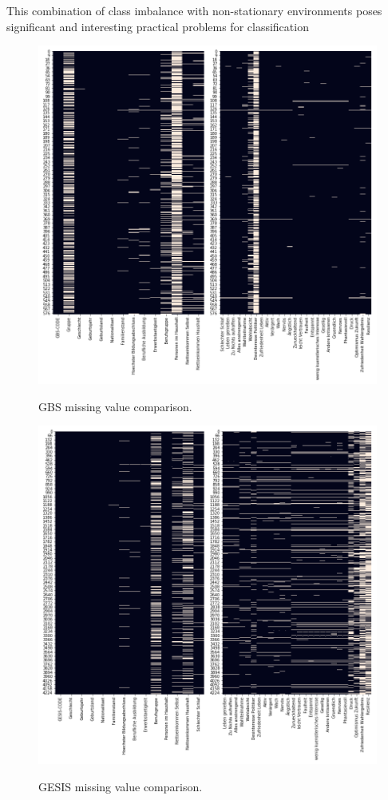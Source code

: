 This combination of class imbalance with non-stationary environments poses signiﬁcant and interesting practical problems for classiﬁcation

\begin{figure}[ht]
	\begin{center}
		\includegraphics[scale=0.50,angle=0]{fig/gbs_missing}
		\label{std}
		\caption{GBS missing value comparison.}
	\end{center}
\end{figure}

\begin{figure}[ht]
	\begin{center}
		\includegraphics[scale=0.50,angle=0]{fig/gesis_missing}
		\label{std}
		\caption{GESIS missing value comparison.}
	\end{center}
\end{figure}

